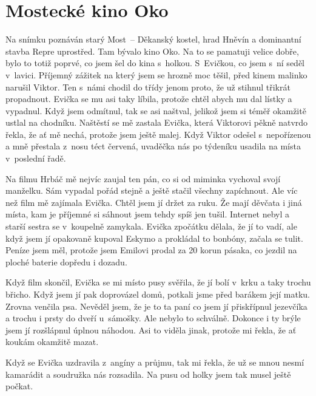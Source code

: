 
\chapter{Mostecké kino Oko}


Na snímku poznáván starý Most~-- Děkanský kostel, hrad Hněvín a dominantní
stavba Repre uprostřed. Tam bývalo kino Oko. Na to se pamatuji velice dobře,
bylo to totiž poprvé, co jsem šel do kina s~holkou. S~Evičkou, co jsem s~ní
seděl v~lavici. Příjemný zážitek na který jsem se hrozně moc těšil, před kinem
malinko narušil Viktor. Ten s~námi chodil do třídy jenom proto, že už stihnul
třikrát propadnout. Evička se mu asi taky líbila, protože chtěl abych mu dal
lístky a vypadnul. Když jsem odmítnul, tak se asi naštval, jelikož jsem si
téměř okamžitě ustlal na chodníku. Naštěstí se mě zastala Evička, která
Viktorovi pěkně natvrdo řekla, že ať mě nechá, protože jsem ještě malej. Když
Viktor odešel s~nepořízenou a mně přestala z~nosu téct červená, uvaděčka nás po
týdeníku usadila na místa v~poslední řadě.

Na filmu Hrbáč mě nejvíc zaujal ten pán, co si od miminka vychoval svojí
manželku. Sám vypadal pořád stejně a ještě stačil všechny zapíchnout. Ale víc
než film mě zajímala Evička. Chtěl jsem jí držet za ruku. Že mají děvčata i
jiná místa, kam je příjemné si sáhnout jsem tehdy spíš jen tušil. Internet
nebyl a starší sestra se v~koupelně zamykala. Evička zpočátku dělala, že jí to
vadí, ale když jsem jí opakovaně kupoval Eskymo a prokládal to bonbóny, začala
se tulit. Peníze jsem měl, protože jsem Emilovi prodal za 20 korun pásaka, co
jezdil na ploché baterie dopředu i dozadu.

Když film skončil, Evička se mi místo pusy svěřila, že jí bolí v~krku a taky
trochu břicho. Když jsem jí pak doprovázel domů, potkali jsme před barákem její
matku. Zrovna venčila psa. Nevěděl jsem, že je to ta paní co jsem jí
přiskřípnul jezevčíka a trochu i prsty do dveří u~sámošky. Ale nebylo to
schválně. Dokonce i ty brýle jsem jí rozšlápnul úplnou náhodou. Asi to viděla
jinak, protože mi řekla, že ať koukám okamžitě mazat.

Když se Evička uzdravila z~angíny a průjmu, tak mi řekla, že už se mnou nesmí
kamarádit a soudružka nás rozsadila. Na pusu od holky jsem tak musel ještě
počkat.
